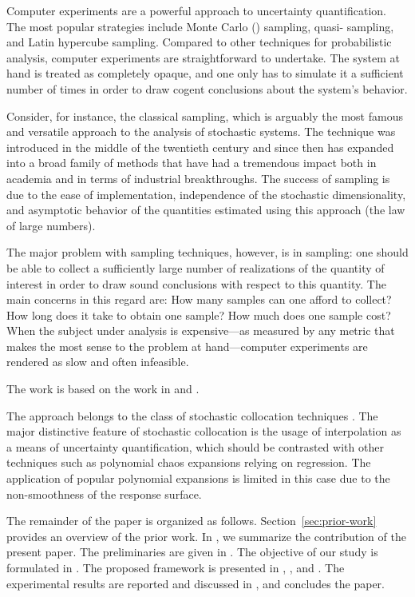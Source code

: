 Computer experiments \cite{santner2003} are a powerful approach to uncertainty
quantification. The most popular strategies include Monte Carlo ()
sampling, quasi- sampling, and Latin hypercube sampling. Compared to
other techniques for probabilistic analysis, computer experiments are
straightforward to undertake. The system at hand is treated as completely
opaque, and one only has to simulate it a sufficient number of times in order to
draw cogent conclusions about the system's behavior.

Consider, for instance, the classical  sampling, which is arguably the
most famous and versatile approach to the analysis of stochastic systems. The
technique was introduced in the middle of the twentieth century and since then
has expanded into a broad family of methods that have had a tremendous impact
both in academia and in terms of industrial breakthroughs. The success of
 sampling is due to the ease of implementation, independence of the
stochastic dimensionality, and asymptotic behavior of the quantities estimated
using this approach (the law of large numbers).

The major problem with sampling techniques, however, is in sampling: one should
be able to collect a sufficiently large number of realizations of the quantity
of interest in order to draw sound conclusions with respect to this quantity.
The main concerns in this regard are: How many samples can one afford to
collect? How long does it take to obtain one sample? How much does one sample
cost? When the subject under analysis is expensive---as measured by any metric
that makes the most sense to the problem at hand---computer experiments are
rendered as slow and often infeasible.

The work is based on the work in \cite{klimke2006} and \cite{ma2009}.

The approach belongs to the class of stochastic collocation techniques
\cite{xiu2010}. The major distinctive feature of stochastic collocation is the
usage of interpolation as a means of uncertainty quantification, which should be
contrasted with other techniques such as polynomial chaos expansions relying on
regression. The application of popular polynomial expansions is limited in this
case due to the non-smoothness of the response surface.

The remainder of the paper is organized as follows. Section~\ref{sec:prior-work}
provides an overview of the prior work. In , we summarize the
contribution of the present paper. The preliminaries are given in
. The objective of our study is formulated in
. The proposed framework is presented in
, , and . The experimental
results are reported and discussed in , and
 concludes the paper.
